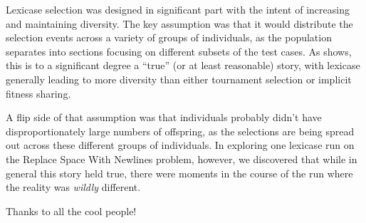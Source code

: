 Lexicase selection \citep{Helmuth:2015:ieeeTEC} was designed in significant part with the intent of 
increasing and maintaining diversity. The key assumption was that it would distribute the selection 
events across a variety of groups of individuals, as the population separates into sections focusing
on different subsets of the test cases. As \cite{helmuth:GPTP15} shows, this is to a significant
degree a ``true'' (or at least reasonable) story, with lexicase generally leading to more diversity
than either tournament selection or implicit fitness sharing.

A flip side of that assumption was that individuals probably didn't have disproportionately 
large numbers of offspring, as the selections are being spread out across these different groups
of individuals. In exploring one lexicase run on the Replace Space With Newlines problem, however,
we discovered that while in general this story held true, there were moments in the course of the run
where the reality was \emph{wildly} different.

\begin{acknowledgement}
	Thanks to all the cool people!
\end{acknowledgement}






